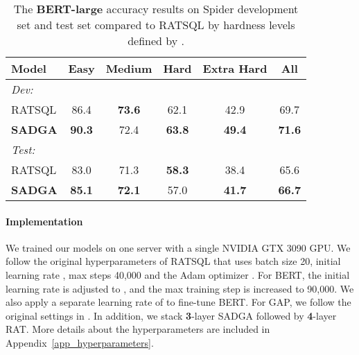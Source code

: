 \documentclass{article}
\begin{document}
\begin{wraptable}{r}{.5\textwidth}
    \setlength\tabcolsep{2pt}
    \caption{The \textbf{BERT-large} accuracy results on Spider development set and test set compared to RATSQL by hardness levels defined by \citet{yu2018spider}.}
    \label{result_levs} 
    \renewcommand\arraystretch{1.1}
    \centering
    \footnotesize
    \begin{tabular}{lccccc}
        \toprule
        \textbf{Model}                              & \textbf{Easy}         & \textbf{Medium}      & \textbf{Hard}        & \textbf{Extra Hard}   & \textbf{All}                   \\ 
        \hline\hline
        \emph{Dev:} \\
        \quad RATSQL                     & 86.4            & \textbf{73.6}  & 62.1           & 42.9           & 69.7                     \\
        \quad \textbf{SADGA}              & \textbf{90.3}         & 72.4                 & \textbf{63.8}        & \textbf{49.4}         & \textbf{71.6}                      \\
        \emph{Test:} \\
        \quad RATSQL                     & 83.0            & 71.3  & \textbf{58.3}           & 38.4           & 65.6                     \\
        \quad \textbf{SADGA}              & \textbf{85.1}         & \textbf{72.1}                 & 57.0        & \textbf{41.7}         & \textbf{66.7}                      \\
        \bottomrule 
    \end{tabular}
\end{wraptable}

\paragraph{Implementation}
We trained our models on one server with a single NVIDIA GTX 3090 GPU. We follow the original hyperparameters of RATSQL \citep{wang2020rat} that uses batch size 20, initial learning rate , max steps 40,000 and the Adam optimizer \citep{kingma2014adam}. For BERT, the initial learning rate is adjusted to , and the max training step is increased to 90,000.  We also apply a separate learning rate of  to fine-tune BERT. For GAP, we follow the original settings in \citet{shi2021learning}. In addition, we stack \textbf{3}-layer SADGA followed by \textbf{4}-layer RAT. More details about the hyperparameters are included in Appendix~\ref{app_hyperparameters}.
\end{document}
